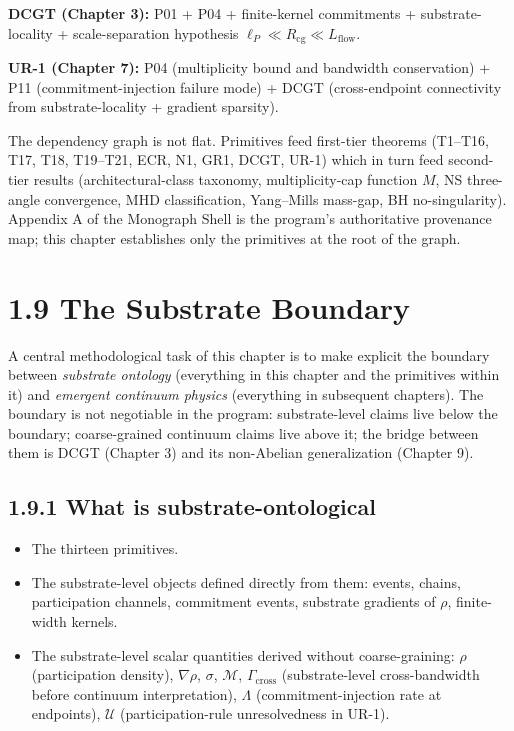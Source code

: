 \documentclass[11pt]{book}
\begin{document}
\textbf{DCGT (Chapter 3):} P01 + P04 + finite-kernel commitments + substrate-locality + scale-separation hypothesis $\ell_P \ll R_\mathrm{cg} \ll L_\mathrm{flow}$.

\textbf{UR-1 (Chapter 7):} P04 (multiplicity bound and bandwidth conservation) + P11 (commitment-injection failure mode) + DCGT (cross-endpoint connectivity from substrate-locality + gradient sparsity).

The dependency graph is not flat. Primitives feed first-tier theorems (T1–T16, T17, T18, T19–T21, ECR, N1, GR1, DCGT, UR-1) which in turn feed second-tier results (architectural-class taxonomy, multiplicity-cap function $M$, NS three-angle convergence, MHD classification, Yang–Mills mass-gap, BH no-singularity). Appendix A of the Monograph Shell is the program's authoritative provenance map; this chapter establishes only the primitives at the root of the graph.

\section{1.9 The Substrate Boundary}

A central methodological task of this chapter is to make explicit the boundary between \textit{substrate ontology} (everything in this chapter and the primitives within it) and \textit{emergent continuum physics} (everything in subsequent chapters). The boundary is not negotiable in the program: substrate-level claims live below the boundary; coarse-grained continuum claims live above it; the bridge between them is DCGT (Chapter 3) and its non-Abelian generalization (Chapter 9).

\subsection{1.9.1 What is substrate-ontological}

\begin{itemize}
\item The thirteen primitives.
\item The substrate-level objects defined directly from them: events, chains, participation channels, commitment events, substrate gradients of $\rho$, finite-width kernels.
\item The substrate-level scalar quantities derived without coarse-graining: $\rho$ (participation density), $\nabla\rho$, $\sigma$, $\mathcal{M}$, $\Gamma_\mathrm{cross}$ (substrate-level cross-bandwidth before continuum interpretation), $\Lambda$ (commitment-injection rate at endpoints), $\mathcal{U}$ (participation-rule unresolvedness in UR-1).
\end{itemize}
\end{document}
